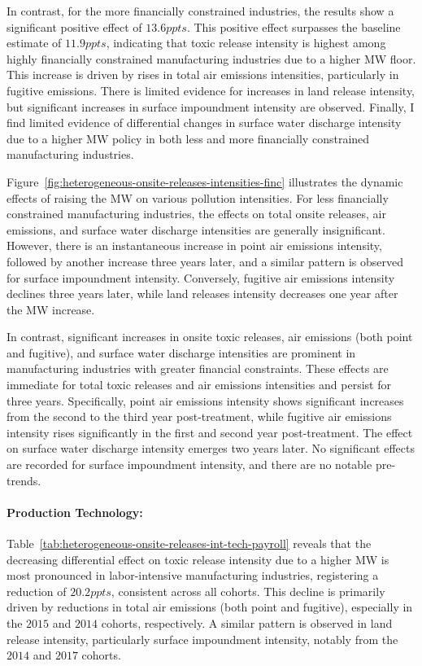 \documentclass[12pt, english]{article}
\begin{document}
    In contrast, for the more financially constrained industries, the results show a significant positive effect of $13.6ppts$. This positive effect surpasses the baseline estimate of $11.9ppts$, indicating that toxic release intensity is highest among highly financially constrained manufacturing industries due to a higher MW floor. This increase is driven by rises in total air emissions intensities, particularly in fugitive emissions. There is limited evidence for increases in land release intensity, but significant increases in surface impoundment intensity are observed. Finally, I find limited evidence of differential changes in surface water discharge intensity due to a higher MW policy in both less and more financially constrained manufacturing industries.

    Figure~\ref{fig:heterogeneous-onsite-releases-intensities-finc} illustrates the dynamic effects of raising the MW on various pollution intensities. For less financially constrained manufacturing industries, the effects on total onsite releases, air emissions, and surface water discharge intensities are generally insignificant. However, there is an instantaneous increase in point air emissions intensity, followed by another increase three years later, and a similar pattern is observed for surface impoundment intensity. Conversely, fugitive air emissions intensity declines three years later, while land releases intensity decreases one year after the MW increase.
    

    In contrast, significant increases in onsite toxic releases, air emissions (both point and fugitive), and surface water discharge intensities are prominent in manufacturing industries with greater financial constraints. These effects are immediate for total toxic releases and air emissions intensities and persist for three years. Specifically, point air emissions intensity shows significant increases from the second to the third year post-treatment, while fugitive air emissions intensity rises significantly in the first and second year post-treatment. The effect on surface water discharge intensity emerges two years later. No significant effects are recorded for surface impoundment intensity, and there are no notable pre-trends.

    \paragraph{Production Technology:}
    Table~\ref{tab:heterogeneous-onsite-releases-int-tech-payroll} reveals that the decreasing differential effect on toxic release intensity due to a higher MW is most pronounced in labor-intensive manufacturing industries, registering a reduction of $20.2ppts$, consistent across all cohorts. This decline is primarily driven by reductions in total air emissions (both point and fugitive), especially in the $2015$ and $2014$ cohorts, respectively. A similar pattern is observed in land release intensity, particularly surface impoundment intensity, notably from the $2014$ and $2017$ cohorts.
    
\end{document}
